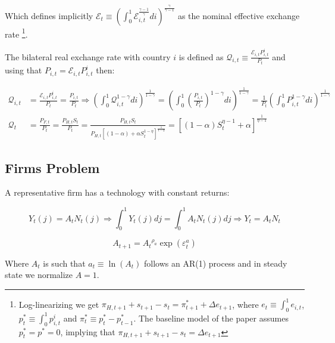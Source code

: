 \documentclass{article}
\newcommand{\E}{\mathcal{E}}
\begin{document}
Which defines implicitly $\E_{t} \equiv \left( \int^1_0 \E_{i,t}^{\frac{\gamma-1}{\gamma}} di \right)^{\frac{\gamma}{\gamma-1}}$ as the nominal effective exchange rate \footnote{Log-linearizing we get $\pi_{H,t+1} + s_{t+1} - s_t = \pi^*_{t+1} + \Delta e_{t+1}$, where $e_t \equiv \int^1_0 e_{i,t}$, $p_t^* \equiv \int^1_0 p^i_{i,t}$ and $\pi^*_t \equiv p_t^* - p_{t-1}^*$. The baseline model of the paper assumes $p_t^* = p^* = 0$, implying that $\pi_{H,t+1} + s_{t+1} - s_t = \Delta e_{t+1}$}.

The bilateral real exchange rate with country $i$ is defined as $\mathcal{Q}_{i,t} \equiv \frac{\E_{i,t} P^i_{i,t}}{P_t}$ and using that $P_{i,t} = \E_{i,t} P^i_{i,t}$ then:

\begin{equation}
\label{real_rate}
\begin{split}
\mathcal{Q}_{i,t} & = \frac{\E_{i,t} P^i_{i,t}}{P_t} = \frac{P_{i,t}}{P_t} \Rightarrow \left( \int^1_0 \mathcal Q_{i,t}^{1-\gamma} di \right)^{\frac{1}{1-\gamma}} = \left( \int^1_0 \left(\frac{P_{i,t}}{P_t}\right)^{1-\gamma} di \right)^{\frac{1}{1-\gamma}} = \frac{1}{P_t}\left( \int^1_0 P_{i,t}^{1-\gamma} di \right)^{\frac{1}{1-\gamma}} \\
\mathcal{Q}_{t} & = \frac{P_{F,t}}{P_t} = \frac{P_{H,t} S_t}{P_t} = \frac{P_{H,t} S_t}{P_{H,t} \left[(1-\alpha) + \alpha S_t^{1-\eta} \right]^{\frac{1}{1-\eta}}} = \left[(1-\alpha)S_t^{\eta-1} + \alpha \right]^{\frac{1}{\eta-1}}
\end{split}
\end{equation}


\subsection{Firms Problem}
A representative firm has a technology with constant returns:

\begin{equation}
    \label{technology}
    Y_t(j) = A_t N_t(j) \Rightarrow \int^1_0 Y_t(j) dj = \int^1_0 A_t N_t(j) dj \Rightarrow Y_t = A_t N_t
\end{equation}

\begin{equation}
    \label{tfp}
    A_{t+1} = {A_t}^{\rho_a}\exp( \varepsilon^a_t)
\end{equation}

Where $A_t$ is such that $a_t \equiv \ln(A_t)$ follows an AR(1) process and in steady state we normalize $A = 1$.\\
\end{document}

